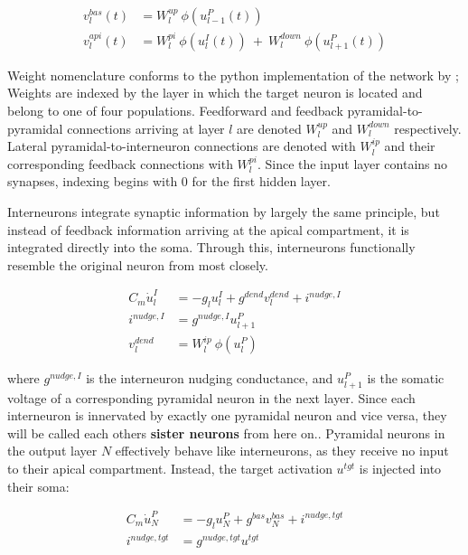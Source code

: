 \begin{align}
  v_l^{bas}(t) & = W_l^{up} \ \phi(u_{l-1}^P(t)) \label{eq-v-bas-rate}                                     \\
  v_l^{api}(t) & =  W_l^{pi} \ \phi(u_l^I(t)) \ + \  W_l^{down} \ \phi(u_{l+1}^P(t)) \label{eq-v-api-rate}
\end{align}

Weight nomenclature conforms to the python implementation of the network by \cite{Haider2021}; Weights are indexed by
the layer in which the target neuron is located and belong to one of four populations. Feedforward and feedback
pyramidal-to-pyramidal connections arriving at layer $l$ are denoted $W_l^{up}$ and $W_l^{down}$ respectively. Lateral
pyramidal-to-interneuron connections are denoted with $W_l^{ip}$ and their corresponding feedback connections with
$W_l^{pi}$. Since the input layer contains no synapses, indexing begins with $0$ for the first hidden layer. \newline

Interneurons integrate synaptic information by largely the same principle, but instead of feedback information arriving
at the apical compartment, it is integrated directly into the soma. Through this, interneurons functionally resemble the
original neuron from \cite{urbanczik2014learning} most closely.

\begin{align}
  C_m \dot{u}_l^I & = - g_l u_l^{I} + g^{dend} v_l^{dend} + i^{nudge, I}\label{eq-intn-dynamics} \\
  i^{nudge, I}    & = g^{nudge, I} u_{l+1}^P                                                     \\
  v_l^{dend}      & = W_l^{ip} \ \phi(u_{l}^P)
\end{align}

where $ g^{nudge, I}$ is the interneuron nudging conductance, and $u_{l+1}^P$ is the somatic voltage of a corresponding
pyramidal neuron in the next layer. Since each interneuron is innervated by exactly one pyramidal neuron and vice versa,
they will be called each others \textbf{sister neurons} from here on.. Pyramidal neurons in the output layer $N$ effectively behave like interneurons, as they receive no input
to their apical compartment. Instead, the target  activation $u^{tgt}$ is injected into their soma:

\begin{align}
  C_m \dot{u}_N^P & = - g_l u_N^{P} + g^{bas} v_N^{bas} + i^{nudge, tgt} \\
  i^{nudge, tgt}  & = g^{nudge, tgt} u^{tgt}
\end{align}


